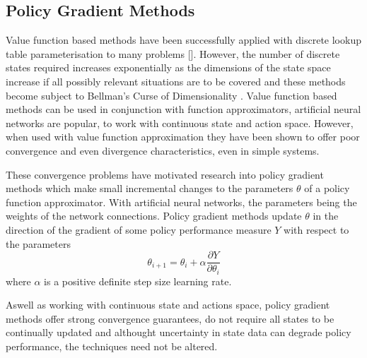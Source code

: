 \subsection{Policy Gradient Methods}
\label{sec:policygradient}
%
Value function based methods have been successfully applied with discrete lookup
table parameterisation to many problems [].  However, the number of discrete
states required increases exponentially as the dimensions of the state space
increase if all possibly relevant situations are to be covered and these
methods become subject to Bellman's Curse of Dimensionality
\cite{bellman:1961}.  Value function based methods can be used in conjunction
with function approximators, artificial neural networks are popular, to work
with continuous state and action space.  However, when used with value
function approximation they have been shown to offer poor convergence and even
divergence characteristics, even in simple systems.

These convergence problems have motivated research into policy gradient methods
which make small incremental changes to the parameters $\theta$ of a policy
function approximator.  With artificial neural networks, the parameters being
the weights of the network connections.  Policy gradient methods update
$\theta$ in the direction of the gradient of some policy performance measure
$Y$ with respect to the parameters
\begin{equation}
\theta_{i+1} = \theta_i + \alpha \frac{\partial Y}{\partial \theta_i}
\end{equation}
where $\alpha$ is a positive definite step size learning rate.

Aswell as working with continuous state and actions space, policy gradient
methods offer strong convergence guarantees, do not require all states to be
continually updated and althought uncertainty in state data can degrade policy
performance, the techniques need not be altered.

